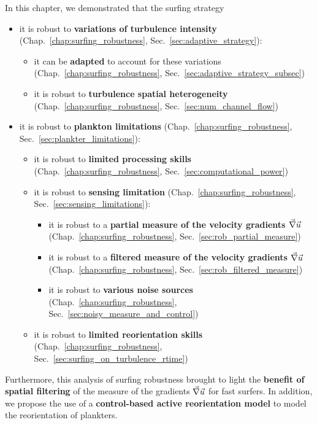 In this chapter, we demonstrated that the surfing strategy
\begin{itemize}
	\item it is robust to \textbf{variations of turbulence intensity} (Chap.~\ref{chap:surfing_robustness}, Sec.~\ref{sec:adaptive_strategy}):
		\begin{itemize}
			\item it can be \textbf{adapted} to account for these variations (Chap.~\ref{chap:surfing_robustness}, Sec.~\ref{sec:adaptive_strategy_subsec})
			\item it is robust to \textbf{turbulence spatial heterogeneity} (Chap.~\ref{chap:surfing_robustness}, Sec.~\ref{sec:num_channel_flow})
		\end{itemize}
	\item it is robust to \textbf{plankton limitations} (Chap.~\ref{chap:surfing_robustness}, Sec.~\ref{sec:plankter_limitations}):
		\begin{itemize}
			\item it is robust to \textbf{limited processing skills} (Chap.~\ref{chap:surfing_robustness}, Sec.~\ref{sec:computational_power})
			\item it is robust to \textbf{sensing limitation} (Chap.~\ref{chap:surfing_robustness}, Sec.~\ref{sec:sensing_limitations}):
				\begin{itemize}
					\item it is robust to a \textbf{partial measure of the velocity gradients $\vec{\nabla} \vec{u}$} (Chap.~\ref{chap:surfing_robustness}, Sec.~\ref{sec:rob_partial_measure})
					\item it is robust to a \textbf{filtered measure of the velocity gradients $\vec{\nabla} \vec{u}$} (Chap.~\ref{chap:surfing_robustness}, Sec.~\ref{sec:rob_filtered_measure})
					\item it is robust to \textbf{various noise sources} (Chap.~\ref{chap:surfing_robustness}, Sec.~\ref{sec:noisy_measure_and_control})
				\end{itemize}
			\item it is robust to \textbf{limited reorientation skills} (Chap.~\ref{chap:surfing_robustness}, Sec.~\ref{sec:surfing_on_turbulence_rtime})
		\end{itemize}
\end{itemize}
Furthermore, this analysis of surfing robustness brought to light the \textbf{benefit of spatial filtering} of the measure of the gradients $\vec{\nabla} \vec{u}$ for fast surfers.
In addition, we propose the use of a \textbf{control-based active reorientation model} to model the reorientation of plankters.

